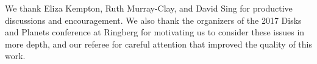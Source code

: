 \documentclass[twocolumn]{aastex61}
\begin{document}
\acknowledgements We thank Eliza Kempton, Ruth Murray-Clay, and David
Sing for productive discussions and encouragement.  We also thank the
organizers of the 2017 Disks and Planets conference at Ringberg for
motivating us to consider these issues in more depth, and our referee
for careful attention that improved the quality of this work.




%








\end{document}
